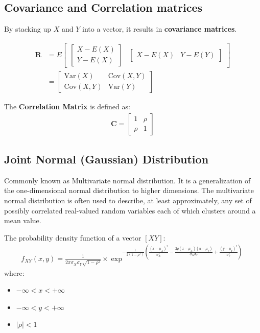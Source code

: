\documentclass[10pt,a4paper]{article}
\begin{document}
\subsection{Covariance and Correlation matrices}

By stacking up $X$ and $Y$ into a vector, it results in \textbf{covariance matrices}.

\begin{align*}
    \textbf{R} &= E
    \begin{bmatrix}
        \begin{bmatrix}
            X-E(X) \\
            Y - E(X)
        \end{bmatrix} & 
        \begin{bmatrix}
            X - E(X) & Y-E(Y)
        \end{bmatrix}
    \end{bmatrix}
    \\
    &= 
    \begin{bmatrix}
        \text{Var}(X) & \text{Cov}(X,Y) \\
        \text{Cov}(X,Y) & \text{Var}(Y)
    \end{bmatrix}
\end{align*}

The \textbf{Correlation Matrix} is defined as:
\begin{align*}
    \textbf{C} = 
    \begin{bmatrix}
        1 & \rho \\
        \rho & 1
    \end{bmatrix}
\end{align*}

\subsection{Joint Normal (Gaussian) Distribution}

Commonly known as Multivariate normal distribution. It is a generalization of the one-dimensional
normal distribution to higher dimensions. The multivariate normal distribution is often used to
describe, at least approximately, any set of possibly correlated real-valued random variables each
of which clusters around a mean value. 

The probability density function of a vector $[XY]$:
\begin{align*}
    f_{XY}(x,y) = \frac{1}{2\pi \sigma_X \sigma_Y \sqrt{1-\rho^2}}\times \exp^{-\frac{1}{2(1-\rho^2)}\left(\frac{(x-\mu_X)^2}{\sigma^2_X}-\frac{2\rho(x-\mu_X)(u-\mu_Y)}{\sigma_X \sigma_Y}+\frac{(y-\mu_Y)^2}{\sigma^2_Y}\right)}
\end{align*}
where:
\begin{itemize}
    \item $-\infty < x < +\infty$
    \item $-\infty < y < +\infty$
    \item $|\rho|<1$
\end{itemize}
\end{document}
